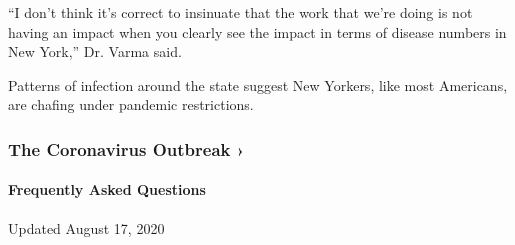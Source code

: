 ``I don't think it's correct to insinuate that the work that we're doing
is not having an impact when you clearly see the impact in terms of
disease numbers in New York,'' Dr. Varma said.

Patterns of infection around the state suggest New Yorkers, like most
Americans, are chafing under pandemic restrictions.

\href{https://www.nytimes3xbfgragh.onion/news-event/coronavirus?action=click\&pgtype=Article\&state=default\&region=MAIN_CONTENT_3\&context=storylines_faq}{}

\hypertarget{the-coronavirus-outbreak-}{%
\subsubsection{The Coronavirus Outbreak
›}\label{the-coronavirus-outbreak-}}

\hypertarget{frequently-asked-questions}{%
\paragraph{Frequently Asked
Questions}\label{frequently-asked-questions}}

Updated August 17, 2020

